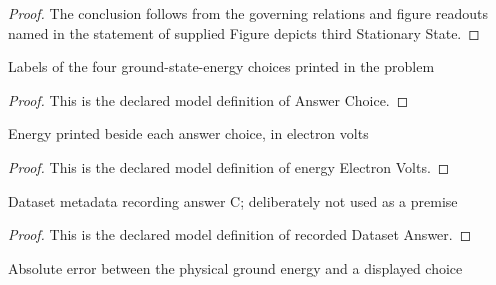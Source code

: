 \begin{proof}
  The conclusion follows from the governing relations and figure readouts named in the statement of supplied Figure depicts third Stationary State.
\end{proof}
\begin{definition}
  \label{def:physics:phyx-mini-0657:phyxminiproblems-problemphyxmini0657-answerchoice}
  Labels of the four ground-state-energy choices printed in the problem
\end{definition}
\begin{proof}
  This is the declared model definition of Answer Choice.
\end{proof}
\begin{definition}
  \label{def:physics:phyx-mini-0657:phyxminiproblems-problemphyxmini0657-answerchoice-energyelectronvolts}
  Energy printed beside each answer choice, in electron volts
\end{definition}
\begin{proof}
  This is the declared model definition of energy Electron Volts.
\end{proof}
\begin{definition}
  \label{def:physics:phyx-mini-0657:phyxminiproblems-problemphyxmini0657-recordeddatasetanswer}
  Dataset metadata recording answer C; deliberately not used as a premise
\end{definition}
\begin{proof}
  This is the declared model definition of recorded Dataset Answer.
\end{proof}
\begin{definition}
  \label{def:physics:phyx-mini-0657:phyxminiproblems-problemphyxmini0657-groundstatechoiceerrorelectronvolts}
  Absolute error between the physical ground energy and a displayed choice
\end{definition}
